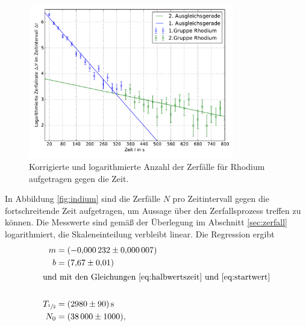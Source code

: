 \begin{figure}[p]
    \centering
    \includegraphics[width=0.8\textwidth]{Bilder/rhodium.pdf}
    \caption{Korrigierte und logarithmierte Anzahl der Zerfälle für Rhodium aufgetragen gegen die Zeit.}
    \label{fig:rhodium}
\end{figure}

In Abbildung \ref{fig:indium} sind die Zerfälle $N$ pro Zeitintervall gegen die fortschreitende Zeit aufgetragen, um Aussage über den Zerfallsprozess treffen zu können.
Die Messwerte sind gemäß der Überlegung im  Abschnitt \ref{sec:zerfall} logarithmiert, die Skaleneinteilung verbleibt linear.
Die Regression ergibt 
\begin{align}
	m &=\SI{-0.000232(7)}{}\\
	b &=\SI{7.67(1)}{}\\
	\intertext{und mit den Gleichungen \eqref{eq:halbwertszeit} und \eqref{eq:startwert}}\\
	T_{\sfrac{1}{2}}&= \SI{2980(90)}{\second}\\
	N_0&=\SI{38000(1000)}{},
\end{align}

